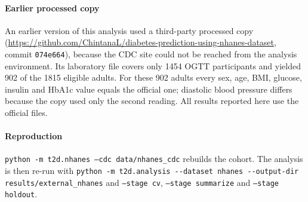 \documentclass[11pt]{article}
\begin{document}
\paragraph{Earlier processed copy} An earlier version of this analysis used a third-party processed copy (\url{https://github.com/ChintanaL/diabetes-prediction-using-nhanes-dataset}, commit \texttt{074e664}), because the CDC site could not be reached from the analysis environment. Its laboratory file covers only 1454 OGTT participants and yielded 902 of the 1815 eligible adults. For these 902 adults every sex, age, BMI, glucose, insulin and HbA1c value equals the official one; diastolic blood pressure differs because the copy used only the second reading. All results reported here use the official files.

\paragraph{Reproduction} \texttt{python -m t2d.nhanes --cdc data/nhanes\_cdc} rebuilds the cohort. The analysis is then re-run with \nolinkurl{python -m t2d.analysis --dataset nhanes --output-dir results/external_nhanes} and \texttt{--stage cv}, \texttt{--stage summarize} and \texttt{--stage holdout}.
\end{document}
